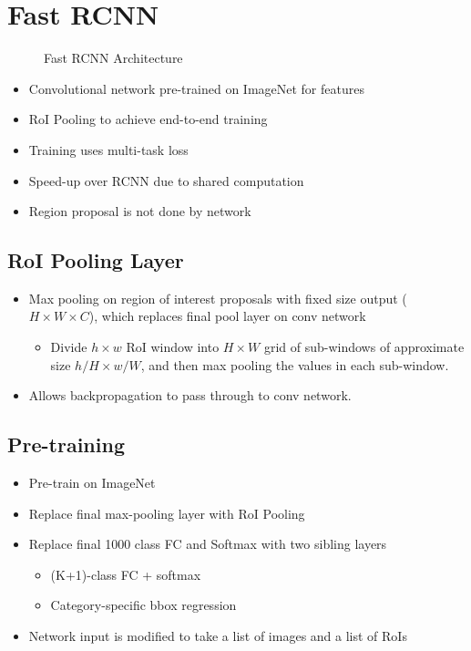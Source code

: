 \section*{Fast RCNN \cite{fast_rcnn}}

\begin{figure}[H]
    \caption{\label{fig:fast_rcnn} Fast RCNN Architecture}
\end{figure}
  
\begin{itemize}
\item Convolutional network pre-trained on ImageNet for features
\item RoI Pooling to achieve end-to-end training
\item Training uses multi-task loss
\item Speed-up over RCNN due to shared computation
\item Region proposal is not done by network
\end{itemize}

\subsection*{RoI Pooling Layer}
\begin{itemize}
\item Max pooling on region of interest proposals with fixed size output ($H \times W \times C$), which replaces final pool layer on conv network

	\begin{itemize}
	\item Divide $h \times w$ RoI window into $H \times W$ grid of sub-windows of approximate size $h/H \times w/W$, and then max pooling the values in each sub-window.
	\end{itemize}

\item Allows backpropagation to pass through to conv network.
\end{itemize}


\subsection*{Pre-training}
\begin{itemize}
\item Pre-train on ImageNet
\item Replace final max-pooling layer with RoI Pooling
\item Replace final 1000 class FC and Softmax with two sibling layers
	\begin{itemize}
	\item  (K+1)-class FC + softmax
	\item Category-specific bbox regression
	\end{itemize}
\item Network input is modified to take a list of images and a list of RoIs
\end{itemize}


